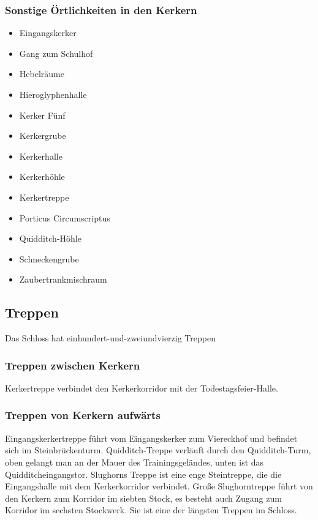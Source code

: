\documentclass[a4paper, 10pt]{article}
\begin{document}
\subsubsection*{\large Sonstige Örtlichkeiten in den Kerkern}
\vspace{10pt}
\begin{itemize}
    \item Eingangskerker
    \item Gang zum Schulhof
    \item Hebelräume
    \item Hieroglyphenhalle
    \item Kerker Fünf
    \item Kerkergrube
    \item Kerkerhalle
    \item Kerkerhöhle
    \item Kerkertreppe
    \item Porticus Circumscriptus
    \item Quidditch-Höhle
    \item Schneckengrube
    \item Zaubertrankmischraum
\end{itemize}

\subsection*{\Large Treppen}
Das Schloss hat einhundert-und-zweiundvierzig Treppen
\subsubsection*{\large Treppen zwischen Kerkern}
Kerkertreppe verbindet den Kerkerkorridor mit der Todestagsfeier-Halle.
\subsubsection*{\large Treppen von Kerkern aufwärts}
Eingangskerkertreppe führt vom Eingangskerker zum Viereckhof und befindet sich im Steinbrückenturm.
Quidditch-Treppe verläuft durch den Quidditch-Turm, oben gelangt man an der Mauer des Trainingsgeländes, unten ist das Quidditcheingangstor.
\vspace{10pt}
\newline
Slughorns Treppe ist eine enge Steintreppe, die die Eingangshalle mit dem Kerkerkorridor verbindet.
\vspace{10pt}
\newline
Große Slughorntreppe führt von den Kerkern zum Korridor im siebten Stock, es besteht auch Zugang zum Korridor im sechsten Stockwerk. Sie ist eine der längsten Treppen im Schloss.
\end{document}
